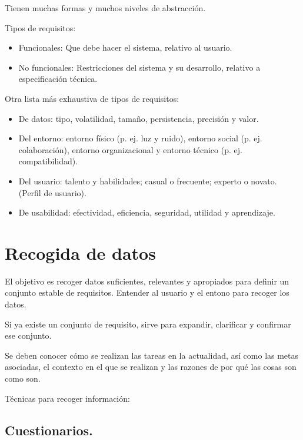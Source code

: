 \documentclass[12pt, twoside, openright]{report} %
\begin{document}
    Tienen muchas formas y muchos niveles de abstracción.
\pagebreak

    Tipos de requisitos:

    \begin{itemize}
    
    \item
      Funcionales: Que debe hacer el sistema, relativo al usuario.
    \item
      No funcionales: Restricciones del sistema y su desarrollo,
      relativo a especificación técnica.
    \end{itemize}

    Otra lista más exhaustiva de tipos de requisitos:

    \begin{itemize}
    
    \item
      De datos: tipo, volatilidad, tamaño, persistencia, precisión y
      valor.
    \item
      Del entorno: entorno físico (p. ej. luz y ruido), entorno social
      (p. ej. colaboración), entorno organizacional y entorno técnico
      (p. ej. compatibilidad).
    \item
      Del usuario: talento y habilidades; casual o frecuente; experto o
      novato. (Perfil de usuario).
    \item
      De usabilidad: efectividad, eficiencia, seguridad, utilidad y
      aprendizaje.
    \end{itemize}

\section{Recogida de datos}



    El objetivo es recoger datos suficientes, relevantes y apropiados
    para definir un conjunto estable de requisitos. Entender al usuario
    y el entono para recoger los datos.

    Si ya existe un conjunto de requisito, sirve para expandir,
    clarificar y confirmar ese conjunto.

    Se deben conocer cómo se realizan las tareas en la actualidad, así
    como las metas asociadas, el contexto en el que se realizan y las
    razones de por qué las cosas son como son.

    Técnicas para recoger información:

\subsection{Cuestionarios.}
\end{document}
